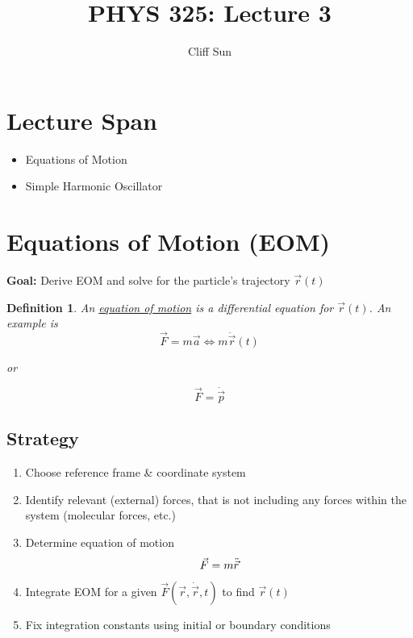 \documentclass{article}
\title{PHYS 325: Lecture 3}
\author{Cliff Sun}
\newtheorem{definition}[theorem]{Definition}
\newtheorem{one minute paper}[theorem]{One Minute Paper}
\begin{document}
\maketitle

\section*{Lecture Span}
\begin{itemize}
    \item Equations of Motion
    \item Simple Harmonic Oscillator
\end{itemize}

\section*{Equations of Motion (EOM)}
\textbf{Goal:} Derive EOM and solve for the particle's trajectory $\vec{r}(t)$

\begin{definition}
    An \underline{equation of motion} is a differential equation for $\vec{r}(t)$. An example is 
    \begin{equation}
        \vec{F} = m\vec{a} \iff m\ddot{\vec{r}}(t)
    \end{equation}
    \begin{center}
        or 
    \end{center}
    \begin{equation}
        \vec{F} = \dot{\vec{p}}
    \end{equation}
\end{definition}

\subsection*{Strategy}
\begin{enumerate}
    \item Choose reference frame \& coordinate system
    \item Identify relevant (external) forces, that is not including any forces within the system (molecular forces, etc.)
    \item Determine equation of motion
    \begin{equation}
        \vec{F} = m\Ddot{\vec{r}}
    \end{equation}
    \item Integrate EOM for a given $\vec{F}(\vec{r}, \dot{\vec{r}}, t)$ to find $\vec{r}(t)$
    \item Fix integration constants using initial or boundary conditions
\end{enumerate}
\end{document}
